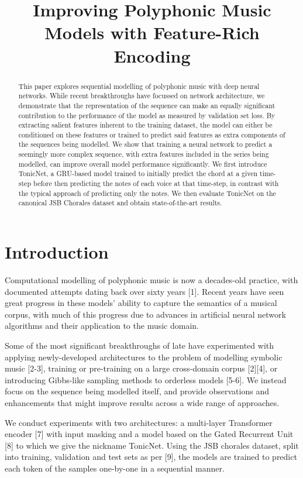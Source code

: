 \documentclass{article}
\title{Improving Polyphonic Music Models with Feature-Rich Encoding}
\begin{document}
\maketitle
\begin{abstract}
This paper explores sequential modelling of polyphonic music with deep neural networks. While recent breakthroughs have focussed on network architecture, we demonstrate that the representation of the sequence can make an equally significant contribution to the performance of the model as measured by validation set loss. By extracting salient features inherent to the training dataset, the model can either be conditioned on these features or trained to predict said features as extra components of the sequences being modelled. We show that training a neural network to predict a seemingly more complex sequence, with extra features included in the series being modelled, can improve overall model performance significantly. We first introduce TonicNet, a GRU-based model trained to initially predict the chord at a given time-step before then predicting the notes of each voice at that time-step, in contrast with the typical approach of predicting only the notes. We then evaluate TonicNet on the canonical JSB Chorales dataset and obtain state-of-the-art results.
\end{abstract}
\section{Introduction}\label{sec:introduction}

Computational modelling of polyphonic music is now a decades-old practice, with documented attempts dating back over sixty years [1]. Recent years have seen great progress in these models' ability to capture the semantics of a musical corpus, with much of this progress due to advances in artificial neural network algorithms and their application to the music domain.

Some of the most significant breakthroughs of late have experimented with applying newly-developed architectures to the problem of modelling symbolic music [2-3], training or pre-training on a large cross-domain corpus [2][4], or introducing Gibbs-like sampling methods to orderless models [5-6]. We instead focus on the sequence being modelled itself, and provide observations and enhancements that might improve results across a wide range of approaches. 

We conduct experiments with two architectures: a multi-layer Transformer encoder [7] with input masking and a model based on the Gated Recurrent Unit [8] to which we give the nickname TonicNet. Using the JSB chorales dataset, split into training, validation and test sets as per [9], the models are trained to predict each token of the samples one-by-one in a sequential manner. 
\end{document}
